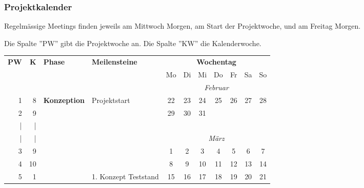 \subsubsection{Projektkalender}

Regelmässige Meetings finden jeweils am Mittwoch Morgen, am Start der Projektwoche, und am Freitag Morgen.

Die Spalte ''PW'' gibt die Projektwoche an. Die Spalte ''KW'' die Kalenderwoche.

\newcommand{\cellblue}[1]{\cellcolor{cyan} #1}
\begin{table}[H]
    \begin{tabular}{r r l l|c c|c c c|c c}
        \toprule
         \textbf{PW} & \textbf{K}      & \textbf{Phase} & \textbf{Meilensteine} & \multicolumn{7}{c}{\textbf{Wochentag}} \\
               &            &                       &                       & Mo                                      & Di & Mi  & Do & Fr & Sa & So \\ \midrule
                           &                         &                       &                       & \multicolumn{7}{c}{\textit{Februar}}   \\
          1                & 8                       & \textbf{Konzeption}         & Projektstart          & 22                                      & 23 & \cellblue{24}  & 25 & 26 & 27 & 28 \\
          2                & 9                       &                       &                       & 29                                      & 30 & 31 \\
          |                & |                       &                       &                       &                                        \\
          |                & |                       &                       &                       & \multicolumn{7}{c}{\textit{März}}      \\
          3                & 9                       &                       &                       & 1                                       & 2  & 3   & 4  & 5  & 6  & 7  \\
          4                & 10                      &                       &                       & 8                                       & 9  & 10  & 11 & 12 & 13 & 14 \\
          5                & 1                       &                       & 1. Konzept Teststand     & 15                                      & 16 & 17  & 18 & 19 & 20 & 21 \\

\end{tabular}
\end{table}
